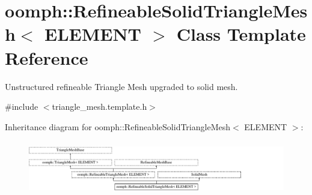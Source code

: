 \hypertarget{classoomph_1_1RefineableSolidTriangleMesh}{}\section{oomph\+:\+:Refineable\+Solid\+Triangle\+Mesh$<$ E\+L\+E\+M\+E\+NT $>$ Class Template Reference}
\label{classoomph_1_1RefineableSolidTriangleMesh}


Unstructured refineable Triangle Mesh upgraded to solid mesh.  




{\ttfamily \#include $<$triangle\+\_\+mesh.\+template.\+h$>$}

Inheritance diagram for oomph\+:\+:Refineable\+Solid\+Triangle\+Mesh$<$ E\+L\+E\+M\+E\+NT $>$\+:\begin{figure}[H]
\begin{center}
\leavevmode
\includegraphics[height=2.408602cm]{classoomph_1_1RefineableSolidTriangleMesh}
\end{center}
\end{figure}
